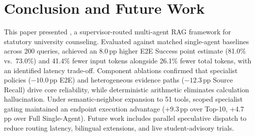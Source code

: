 \section{Conclusion and Future Work}
\label{sec:conclusion}

This paper presented \system{}, a supervisor-routed multi-agent RAG framework for statutory university counseling. Evaluated against matched single-agent baselines across 200 queries, \system{} achieved an 8.0\,pp higher E2E Success point estimate (81.0\% vs.\ 73.0\%) and 41.4\% fewer input tokens alongside 26.1\% fewer total tokens, with an identified latency trade-off. Component ablations confirmed that specialist policies ($-10.0$\,pp E2E) and heterogeneous evidence paths ($-12.3$\,pp Source Recall) drive core reliability, while deterministic arithmetic eliminates calculation hallucination. Under semantic-neighbor expansion to 51 tools, scoped specialist gating maintained an endpoint execution advantage (+9.3\,pp over Top-10, +4.7\,pp over Full Single-Agent). Future work includes parallel speculative dispatch to reduce routing latency, bilingual extensions, and live student-advisory trials.

